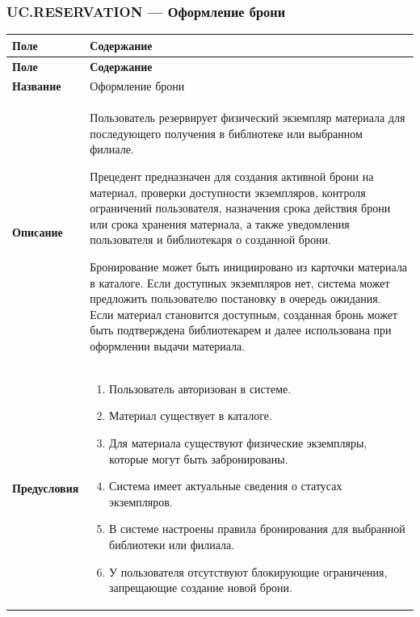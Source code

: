 \documentclass[12pt,a4paper]{article}
\begin{document}
		\label{tab:uc-catalog-specification}
		
		\clearpage
		
		\subsubsection{UC.RESERVATION --- Оформление брони}
		
		\begin{xltabular}{\textwidth}{
				|>{\raggedright\arraybackslash}p{2.7cm}
				|>{\raggedright\arraybackslash}X|
			}
			\hline
			\textbf{Поле} & \textbf{Содержание} \\
			\hline
			\endfirsthead
			
			\hline
			\textbf{Поле} & \textbf{Содержание} \\
			\hline
			\endhead
			
			\hline
			\endfoot
			
			\textbf{Название} &
			Оформление брони \\
			\hline
			
			\textbf{Описание} &
			Пользователь резервирует физический экземпляр материала для
			последующего получения в библиотеке или выбранном филиале.
			
			Прецедент предназначен для создания активной брони на материал,
			проверки доступности экземпляров, контроля ограничений пользователя,
			назначения срока действия брони или срока хранения материала, а также
			уведомления пользователя и библиотекаря о созданной брони.
			
			Бронирование может быть инициировано из карточки материала в каталоге.
			Если доступных экземпляров нет, система может предложить пользователю
			постановку в очередь ожидания. Если материал становится доступным,
			созданная бронь может быть подтверждена библиотекарем и далее
			использована при оформлении выдачи материала. \\
			\hline
			
			\textbf{Предусловия} &
			\begin{enumerate}
				\item Пользователь авторизован в системе.
				\item Материал существует в каталоге.
				\item Для материала существуют физические экземпляры, которые могут
				быть забронированы.
				\item Система имеет актуальные сведения о статусах экземпляров.
				\item В системе настроены правила бронирования для выбранной
				библиотеки или филиала.
				\item У пользователя отсутствуют блокирующие ограничения, запрещающие
				создание новой брони.
			\end{enumerate} \\
			\hline
			

\end{xltabular}
\end{document}
